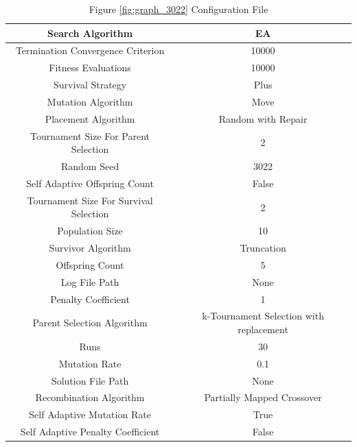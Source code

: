 \documentclass{standalone}
\begin{document}
\begin{table}[!htb]
	\centering
	\caption{Figure \ref{fig:graph_3022} Configuration File}
	\label{tab:graph_3022}
	\begin{tabular}{| c | c |}
		\hline
		Search Algorithm		& EA		 \\
		\hline
		Termination Convergence Criterion		& 10000		 \\
		\hline
		Fitness Evaluations		& 10000		 \\
		\hline
		Survival Strategy		& Plus		 \\
		\hline
		Mutation Algorithm		& Move		 \\
		\hline
		Placement Algorithm		& Random with Repair		 \\
		\hline
		Tournament Size For Parent Selection		& 2		 \\
		\hline
		Random Seed		& 3022		 \\
		\hline
		Self Adaptive Offspring Count		& False		 \\
		\hline
		Tournament Size For Survival Selection		& 2		 \\
		\hline
		Population Size		& 10		 \\
		\hline
		Survivor Algorithm		& Truncation		 \\
		\hline
		Offspring Count		& 5		 \\
		\hline
		Log File Path		& None		 \\
		\hline
		Penalty Coefficient		& 1		 \\
		\hline
		Parent Selection Algorithm		& k-Tournament Selection with replacement		 \\
		\hline
		Runs		& 30		 \\
		\hline
		Mutation Rate		& 0.1		 \\
		\hline
		Solution File Path		& None		 \\
		\hline
		Recombination Algorithm		& Partially Mapped Crossover		 \\
		\hline
		Self Adaptive Mutation Rate		& True		 \\
		\hline
		Self Adaptive Penalty Coefficient		& False		 \\
		\hline
	\end{tabular}
\end{table}
\end{document}
